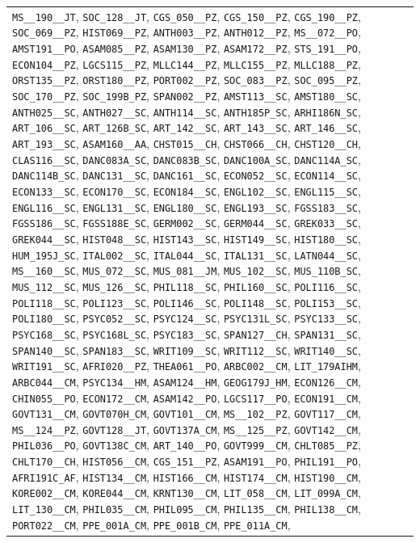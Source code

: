 \begin{longtable}{|p{4.4in}|p{4.4in}|}
\verb|MS__190__JT|, \verb|SOC_128__JT|, \verb|CGS_050__PZ|, \verb|CGS_150__PZ|, \verb|CGS_190__PZ|, \verb|SOC_069__PZ|, \verb|HIST069__PZ|, \verb|ANTH003__PZ|, \verb|ANTH012__PZ|, \verb|MS__072__PO|, \verb|AMST191__PO|, \verb|ASAM085__PZ|, \verb|ASAM130__PZ|, \verb|ASAM172__PZ|, \verb|STS_191__PO|, \verb|ECON104__PZ|, \verb|LGCS115__PZ|, \verb|MLLC144__PZ|, \verb|MLLC155__PZ|, \verb|MLLC188__PZ|, \verb|ORST135__PZ|, \verb|ORST180__PZ|, \verb|PORT002__PZ|, \verb|SOC_083__PZ|, \verb|SOC_095__PZ|, \verb|SOC_170__PZ|, \verb|SOC_199B_PZ|, \verb|SPAN002__PZ|, \verb|AMST113__SC|, \verb|AMST180__SC|, \verb|ANTH025__SC|, \verb|ANTH027__SC|, \verb|ANTH114__SC|, \verb|ANTH185P_SC|, \verb|ARHI186N_SC|, \verb|ART_106__SC|, \verb|ART_126B_SC|, \verb|ART_142__SC|, \verb|ART_143__SC|, \verb|ART_146__SC|, \verb|ART_193__SC|, \verb|ASAM160__AA|, \verb|CHST015__CH|, \verb|CHST066__CH|, \verb|CHST120__CH|, \verb|CLAS116__SC|, \verb|DANC083A_SC|, \verb|DANC083B_SC|, \verb|DANC100A_SC|, \verb|DANC114A_SC|, \verb|DANC114B_SC|, \verb|DANC131__SC|, \verb|DANC161__SC|, \verb|ECON052__SC|, \verb|ECON114__SC|, \verb|ECON133__SC|, \verb|ECON170__SC|, \verb|ECON184__SC|, \verb|ENGL102__SC|, \verb|ENGL115__SC|, \verb|ENGL116__SC|, \verb|ENGL131__SC|, \verb|ENGL180__SC|, \verb|ENGL193__SC|, \verb|FGSS183__SC|, \verb|FGSS186__SC|, \verb|FGSS188E_SC|, \verb|GERM002__SC|, \verb|GERM044__SC|, \verb|GREK033__SC|, \verb|GREK044__SC|, \verb|HIST048__SC|, \verb|HIST143__SC|, \verb|HIST149__SC|, \verb|HIST180__SC|, \verb|HUM_195J_SC|, \verb|ITAL002__SC|, \verb|ITAL044__SC|, \verb|ITAL131__SC|, \verb|LATN044__SC|, \verb|MS__160__SC|, \verb|MUS_072__SC|, \verb|MUS_081__JM|, \verb|MUS_102__SC|, \verb|MUS_110B_SC|, \verb|MUS_112__SC|, \verb|MUS_126__SC|, \verb|PHIL118__SC|, \verb|PHIL160__SC|, \verb|POLI116__SC|, \verb|POLI118__SC|, \verb|POLI123__SC|, \verb|POLI146__SC|, \verb|POLI148__SC|, \verb|POLI153__SC|, \verb|POLI180__SC|, \verb|PSYC052__SC|, \verb|PSYC124__SC|, \verb|PSYC131L_SC|, \verb|PSYC133__SC|, \verb|PSYC168__SC|, \verb|PSYC168L_SC|, \verb|PSYC183__SC|, \verb|SPAN127__CH|, \verb|SPAN131__SC|, \verb|SPAN140__SC|, \verb|SPAN183__SC|, \verb|WRIT109__SC|, \verb|WRIT112__SC|, \verb|WRIT140__SC|, \verb|WRIT191__SC|, \verb|AFRI020__PZ|, \verb|THEA061__PO|, \verb|ARBC002__CM|, \verb|LIT_179AIHM|, \verb|ARBC044__CM|, \verb|PSYC134__HM|, \verb|ASAM124__HM|, \verb|GEOG179J_HM|, \verb|ECON126__CM|, \verb|CHIN055__PO|, \verb|ECON172__CM|, \verb|ASAM142__PO|, \verb|LGCS117__PO|, \verb|ECON191__CM|, \verb|GOVT131__CM|, \verb|GOVT070H_CM|, \verb|GOVT101__CM|, \verb|MS__102__PZ|, \verb|GOVT117__CM|, \verb|MS__124__PZ|, \verb|GOVT128__JT|, \verb|GOVT137A_CM|, \verb|MS__125__PZ|, \verb|GOVT142__CM|, \verb|PHIL036__PO|, \verb|GOVT138C_CM|, \verb|ART_140__PO|, \verb|GOVT999__CM|, \verb|CHLT085__PZ|, \verb|CHLT170__CH|, \verb|HIST056__CM|, \verb|CGS_151__PZ|, \verb|ASAM191__PO|, \verb|PHIL191__PO|, \verb|AFRI191C_AF|, \verb|HIST134__CM|, \verb|HIST166__CM|, \verb|HIST174__CM|, \verb|HIST190__CM|, \verb|KORE002__CM|, \verb|KORE044__CM|, \verb|KRNT130__CM|, \verb|LIT_058__CM|, \verb|LIT_099A_CM|, \verb|LIT_130__CM|, \verb|PHIL035__CM|, \verb|PHIL095__CM|, \verb|PHIL135__CM|, \verb|PHIL138__CM|, \verb|PORT022__CM|, \verb|PPE_001A_CM|, \verb|PPE_001B_CM|, \verb|PPE_011A_CM|, 
\end{longtable}
